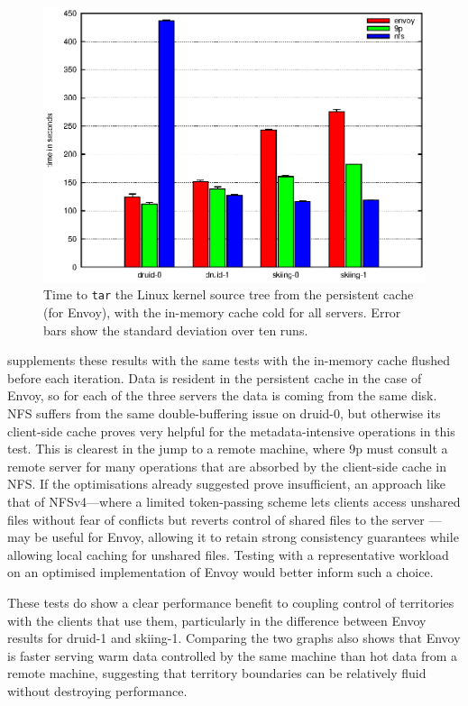 \begin{figure}[t]
\centering
\includegraphics[width=\figwidth]{figures/arch-tar-warm}
\caption[\texttt{tar} benchmark results with a warm cache]{Time to \texttt{tar} the Linux kernel source tree from the persistent cache (for Envoy), with the in-memory cache cold for all servers. Error bars show the standard deviation over ten runs.}
\label{fig:arch-tar-warm}
\end{figure}

 supplements these results with the same tests with the in-memory cache flushed before each iteration. Data is resident in the persistent cache in the case of Envoy, so for each of the three servers the data is coming from the same disk. NFS suffers from the same double-buffering issue on druid-0, but otherwise its client-side cache proves very helpful for the metadata-intensive operations in this test. This is clearest in the jump to a remote machine, where 9p must consult a remote server for many operations that are absorbed by the client-side cache in NFS. If the optimisations already suggested prove insufficient, an approach like that of NFSv4---where a limited token-passing scheme lets clients access unshared files without fear of conflicts but reverts control of shared files to the server \cite{shepler}---may be useful for Envoy, allowing it to retain strong consistency guarantees while allowing local caching for unshared files. Testing with a representative workload on an optimised implementation of Envoy would better inform such a choice.

These tests do show a clear performance benefit to coupling control of territories with the clients that use them, particularly in the difference between Envoy results for druid-1 and skiing-1. Comparing the two graphs also shows that Envoy is faster serving warm data controlled by the same machine than hot data from a remote machine, suggesting that territory boundaries can be relatively fluid without destroying performance.

